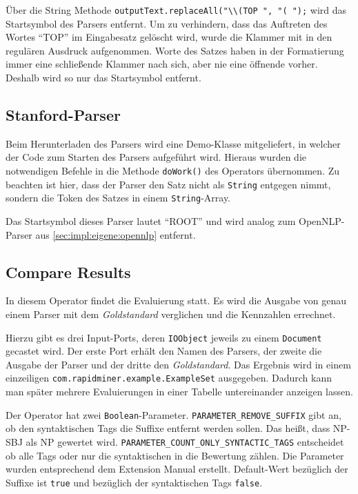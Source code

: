 Über die String Methode \texttt{outputText.replaceAll("\textbackslash \textbackslash (TOP ", "( ");} wird das Startsymbol des Parsers entfernt. Um zu verhindern, dass das Auftreten des Wortes ``TOP'' im Eingabesatz gelöscht wird, wurde die Klammer mit in den regulären Ausdruck aufgenommen. Worte des Satzes haben in der Formatierung immer eine schließende Klammer nach sich, aber nie eine öffnende vorher. Deshalb wird so nur das Startsymbol entfernt.

\subsection{Stanford-Parser}

Beim Herunterladen des Parsers wird eine Demo-Klasse mitgeliefert, in welcher der Code zum Starten des Parsers aufgeführt wird. Hieraus wurden die notwendigen Befehle in die Methode \texttt{doWork()} des Operators übernommen. Zu beachten ist hier, dass der Parser den Satz nicht als \texttt{String} entgegen nimmt, sondern die Token des Satzes in einem \texttt{String}-Array.

Das Startsymbol dieses Parser lautet ``ROOT'' und wird analog zum OpenNLP-Parser aus \ref{sec:impl:eigene:opennlp} entfernt.

\subsection{Compare Results}

In diesem Operator findet die Evaluierung statt. Es wird die Ausgabe von genau einem Parser mit dem \textit{Goldstandard} verglichen und die Kennzahlen errechnet.

Hierzu gibt es drei Input-Ports, deren \texttt{IOObject} jeweils zu einem \texttt{Document} gecastet wird. Der erste Port erhält den Namen des Parsers, der zweite die Ausgabe der Parser und der dritte den \textit{Goldstandard}. Das Ergebnis wird in einem einzeiligen  \texttt{com.rapidminer.example.ExampleSet} ausgegeben. Dadurch kann man später mehrere Evaluierungen in einer Tabelle untereinander anzeigen lassen. 

Der Operator hat zwei \texttt{Boolean}-Parameter. \texttt{PARAMETER\_REMOVE\_SUFFIX} gibt an, ob den syntaktischen Tags die Suffixe entfernt werden sollen. Das heißt, dass NP-SBJ als NP gewertet wird. \texttt{PARAMETER\_COUNT\_ONLY\_SYNTACTIC\_TAGS} entscheidet ob alle Tags oder nur die syntaktischen in die Bewertung zählen. Die Parameter wurden entsprechend dem Extension Manual \cite{rmguide} erstellt. Default-Wert bezüglich der Suffixe ist \texttt{true} und bezüglich der syntaktischen Tags \texttt{false}.

